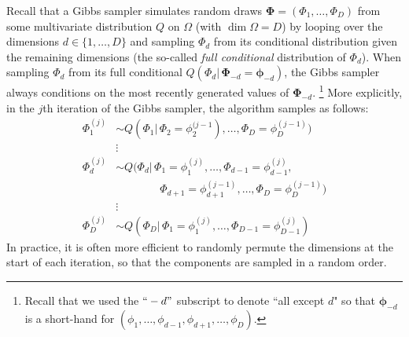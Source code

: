 \documentclass[final,3p,times,twocolumn]{elsarticle}
\let\bs\boldsymbol
\begin{document}
Recall that a Gibbs sampler simulates random draws $\bs \Phi = (\Phi_1,\dots,\Phi_D)$ from some multivariate distribution $Q$ on $\Omega$ (with $\dim\Omega = D$) by looping over the dimensions $d \in \{1,\dots,D\}$ and sampling $\Phi_d$ from its conditional distribution given the remaining dimensions (the so-called \emph{full conditional} distribution of $\Phi_d$).
When sampling $\Phi_d$ from its full conditional $Q(\Phi_d|\,\bs\Phi_{-d} = \bs \phi_{-d})$, the Gibbs sampler always conditions on the most recently generated values of $\bs \Phi_{-d}$.
\footnote{Recall that we used the $``-d"$ subscript to denote ``all except $d$" so that $\bs \phi_{-d}$ is a short-hand for $(\phi_1,\dots,\phi_{d-1},\phi_{d+1},\dots,\phi_{D})$.}
More explicitly, in the $j$th iteration of the Gibbs sampler, the algorithm samples as follows:
\begin{equation}
\label{eqn:Gibbs}
\begin{split}
\Phi_1^{(j)} &\sim Q(\Phi_1|\,\Phi_2 = \phi_2^{(j-1}),\dots,\Phi_D = \phi_D^{(j-1)})\\
&\vdots\\
\Phi_d^{(j)} &\sim Q(\Phi_d|\,\Phi_1 = \phi_1^{(j)},\dots,\Phi_{d-1}=\phi_{d-1}^{(j)},\\
&\qquad\qquad \Phi_{d+1}=\phi_{d+1}^{(j-1)},\dots,\Phi_D=\phi_D^{(j-1)})\\
&\vdots\\
\Phi_D^{(j)} &\sim Q(\Phi_D|\,\Phi_1=\phi_1^{(j)},\dots,\Phi_{D-1}=\phi_{D-1}^{(j)})
\end{split}
\end{equation}
In practice, it is often more efficient to randomly permute the dimensions at the start of each iteration, so that the components are sampled in a random order.
\end{document}
